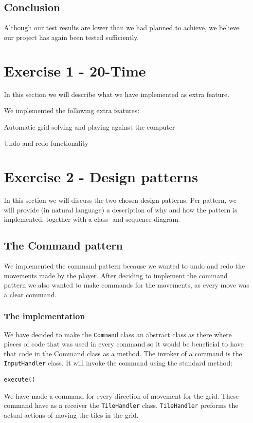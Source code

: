 \documentclass[a4paper,11pt,report]{scrartcl}
\begin{document}
\subsection{Conclusion}
Although our test results are lower than we had planned to achieve, we believe
our project has again been tested sufficiently.

\newpage\section{Exercise 1 - 20-Time}
In this section we will describe what we have implemented as extra feature.

We implemented the following extra features:
\begin{description}
	\item Automatic grid solving and playing against the computer
	\item Undo and redo functionality
\end{description}

\newpage\section{Exercise 2 - Design patterns}
In this section we will discuss the two chosen design patterns. Per pattern,
we will provide (in natural language) a description of why and how the pattern
is implemented, together with a class- and sequence diagram.

\subsection{The Command pattern}
We implemented the command pattern because we wanted to undo and redo the movements made by the player. After deciding to implement the command pattern we also wanted to make commands for the movements, as every move was a clear command.

\subsubsection{The implementation}
We have decided to make the \texttt{Command} class an abstract class as there where pieces of code that was used in every command so it would be beneficial to have that code in the Command class as a method.  The invoker of a command is the \texttt{InputHandler} class. It will invoke the command using the standard method: 
\begin{verbatim}
execute()
\end{verbatim}
We have made a command for every direction of movement for the grid. These command have as a receiver the \texttt{TileHandler} class. \texttt{TileHandler} preforms the actual actions of moving the tiles in the grid.\\
\end{document}
